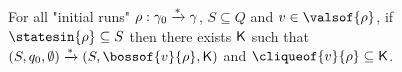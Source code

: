 



\begin{lemma}
	\label{lem:proof_completeness_covset_constant}
	For all "initial runs" $\rho: \gamma_0 \xrightarrow{*} \gamma$, $S \subseteq Q$ and $\aval \in \valsof{\run}$, if $\statesin{\run} \subseteq S$ then there exists $\mathsf{K}$ such that $(S, q_0, \emptyset) \step{*} (S,\bossof{\aval}{\run}, \clique)$ and $\cliqueof{\aval}{\run} \subseteq \clique$. 
\end{lemma}

